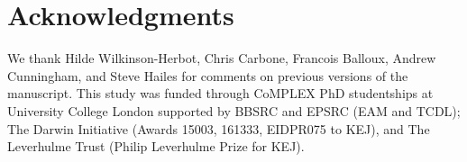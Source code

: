 \documentclass[a4paper,10pt,reqno,oneside]{amsart}
\begin{document}
\section*{Acknowledgments}
We thank Hilde Wilkinson-Herbot, Chris Carbone, Francois Balloux, Andrew Cunningham, and Steve Hailes for comments on previous versions of the manuscript. This study was funded through CoMPLEX PhD studentships at University College London supported by BBSRC and EPSRC (EAM and TCDL); The Darwin Initiative (Awards 15003, 161333, EIDPR075 to KEJ), and The Leverhulme Trust (Philip Leverhulme Prize for KEJ).

	
	
\end{document}
